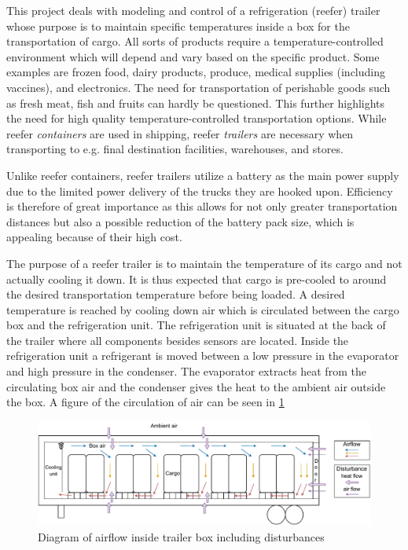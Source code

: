 This project deals with modeling and control of a refrigeration (reefer) trailer whose purpose is to maintain specific temperatures inside a box for the transportation of cargo. All sorts of products require a temperature-controlled environment which will depend and vary based on the specific product. Some examples are frozen food, dairy products, produce, medical supplies (including vaccines), and electronics. The need for transportation of perishable goods such as fresh meat, fish and fruits can hardly be questioned. This further highlights the need for high quality temperature-controlled transportation options. While reefer \textit{containers} are used in shipping, reefer \textit{trailers} are necessary when transporting to e.g. final destination facilities, warehouses, and stores.

Unlike reefer containers, reefer trailers utilize a battery as the main power supply due to the limited power delivery of the trucks they are hooked upon. Efficiency is therefore of great importance as this allows for not only greater transportation distances but also a possible reduction of the battery pack size, which is appealing because of their high cost.

The purpose of a reefer trailer is to maintain the temperature of its cargo and not actually cooling it down. It is thus expected that cargo is pre-cooled to around the desired transportation temperature before being loaded. A desired temperature is reached by cooling down air which is circulated between the cargo box and the refrigeration unit. The refrigeration unit is situated at the back of the trailer where all components besides sensors are located. Inside the refrigeration unit a refrigerant is moved between a low pressure in the evaporator and high pressure in the condenser. The evaporator extracts heat from the circulating box air and the condenser gives the heat to the ambient air outside the box. A figure of the circulation of air can be seen in \cref{fig:trailer_airflow}

\begin{figure}[h]
	\centering
	\includegraphics[width = 0.8\linewidth]{Graphics/Trailer_airflow.pdf}
	\caption{Diagram of airflow inside trailer box including disturbances}
	\label{fig:trailer_airflow}
\end{figure}


